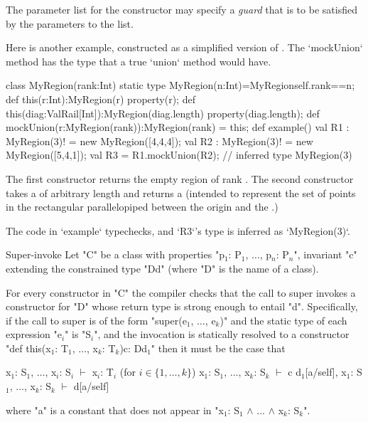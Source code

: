 \label{ConstructorGuard}

The parameter list for the constructor
may specify a \emph{guard} that is to be satisfied by the parameters
to the list.

\begin{example}
Here is another example, constructed as a simplified 
version of .  The \xcd`mockUnion` method 
has the type that a true \xcd`union` method would have.

\begin{xten}
class MyRegion(rank:Int) {
  static type MyRegion(n:Int)=MyRegion{self.rank==n};
  def this(r:Int):MyRegion(r) {
    property(r);
  }
  def this(diag:ValRail[Int]):MyRegion(diag.length){ 
    property(diag.length);
  }
  def mockUnion(r:MyRegion(rank)):MyRegion(rank) = this;
  def example() {
    val R1 : MyRegion(3)! = new MyRegion([4,4,4]); 
    val R2 : MyRegion(3)! = new MyRegion([5,4,1]); 
    val R3 = R1.mockUnion(R2); // inferred type MyRegion(3)
  }
}
\end{xten}
%
The first constructor returns the empty region of rank .  The
second constructor takes a  of arbitrary length
 and returns a  (intended to represent the set
of points in the rectangular parallelopiped between the origin and the
.)

The code in \xcd`example` typechecks, and \xcd`R3`'s type is inferred as
\xcd`MyRegion(3)`.  


\end{example}

\begin{staticrule}{Super-invoke}
   Let \xcd"C" be a class with properties
   \xcdmath"p$_1$: P$_1$, $\dots$, p$_n$: P$_n$", invariant \xcd"c"
   extending the constrained type \xcd"D{d}" (where \xcd"D" is the name of a class).

   For every constructor in \xcd"C" the compiler checks that the call to
   super invokes a constructor for \xcd"D" whose return type is strong enough
   to entail \xcd"d". Specifically, if the call to super is of the form 
     \xcdmath"super(e$_1$, $\dots$, e$_k$)"
   and the static type of each expression \xcdmath"e$_i$" is
   \xcdmath"S$_i$", and the invocation
   is statically resolved to a constructor
\xcdmath"def this(x$_1$: T$_1$, $\dots$, x$_k$: T$_k$){c}: D{d$_1$}"
   then it must be the case that 
\begin{xtenmath}
x$_1$: S$_1$, $\dots$, x$_i$: S$_i$ $\vdash$ x$_i$: T$_i$  (for $i \in \{1, \dots, k\}$)
x$_1$: S$_1$, $\dots$, x$_k$: S$_k$ $\vdash$ c  
d$_1$[a/self], x$_1$: S$_1$, ..., x$_k$: S$_k$ $\vdash$ d[a/self]      
\end{xtenmath}
\noindent where \xcd"a" is a constant that does not appear in 
\xcdmath"x$_1$: S$_1$ $\wedge$ ... $\wedge$ x$_k$: S$_k$".
\end{staticrule}

